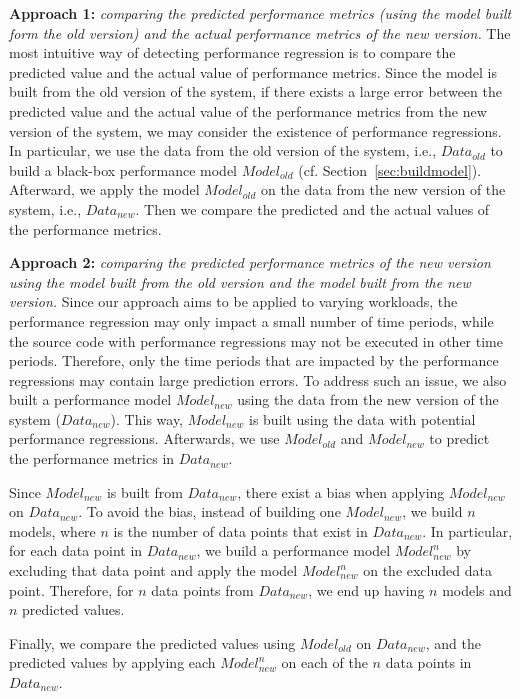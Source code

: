 \noindent\textbf{Approach 1: }\emph{comparing the predicted performance metrics (using the model built form the old version) and the actual performance metrics of the new version.} %
The most intuitive way of detecting performance regression is to compare the predicted value and the actual value of performance metrics. Since the model is built from the old version of the system, if there exists a large error between the predicted value and the actual value of the performance metrics from the new version of the system, we may consider the existence of performance regressions. In particular, we use the data from the old version of the system, i.e., $Data_{old}$ to build a black-box performance model $Model_{old}$ (cf. Section~\ref{sec:buildmodel}). Afterward, we apply the model $Model_{old}$ on the data from the new version of the system, i.e., $Data_{new}$. Then we compare the predicted and the actual values of the performance metrics.


\noindent\textbf{Approach 2: }\emph{comparing the predicted performance metrics of the new version using the model built from the old version and the model built from the new version.} %
Since our approach aims to be applied to varying workloads, the performance regression may only impact a small number of time periods, while the source code with performance regressions may not be executed in other time periods. Therefore, only the time periods that are impacted by the performance regressions may contain large prediction errors. To address such an issue, we also built a performance model $Model_{new}$ using the data from the new version of the system ($Data_{new}$). 
This way, $Model_{new}$ is built using the data with potential performance regressions. 
Afterwards, we use $Model_{old}$ and $Model_{new}$ to predict the performance metrics in $Data_{new}$. 

Since $Model_{new}$ is built from $Data_{new}$, there exist a bias when applying $Model_{new}$ on $Data_{new}$. To avoid the bias, instead of building one $Model_{new}$, we build $n$ models, where $n$ is the number of data points that exist in $Data_{new}$. In particular, for each data point in $Data_{new}$, we build a performance model $Model_{new}^n$ by excluding that data point and apply the model $Model_{new}^n$ on the excluded data point. Therefore, for $n$ data points from $Data_{new}$, we end up having $n$ models and $n$ predicted values. 

Finally, we compare the predicted values using $Model_{old}$ on $Data_{new}$, and the predicted values by applying each $Model_{new}^n$ on each of the $n$ data points in $Data_{new}$.


